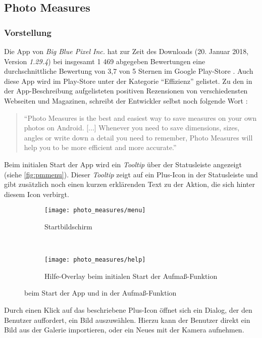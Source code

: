\subsection{Photo Measures}

\subsubsection{Vorstellung}
Die App \pm{} von \emph{Big Blue Pixel Inc.} hat zur Zeit des Downloads (20. Januar 2018, Version \emph{1.29.4}) bei insgesamt 1 469 abgegeben Bewertungen eine durchschnittliche Bewertung von 3,7 von 5 Sternen im Google Play-Store \citep{PixelPM}.
Auch diese App wird im Play-Store unter der Kategorie ``Effizienz'' gelistet.
Zu den in der App-Beschreibung aufgelisteten positiven Rezensionen von verschiedensten Webseiten und Magazinen, schreibt der Entwickler selbst noch folgende Wort \citep{PixelPM}:

\begin{quote}
  ``Photo Measures is the best and easiest way to save measures on your own photos on Android.
  [...] Whenever you need to save dimensions, sizes, angles or write down a detail you need to remember, Photo Measures will help you to be more efficient and more accurate.''
\end{quote}

\noindent
Beim initialen Start der App wird ein \emph{Tooltip} über der Statusleiste angezeigt (siehe \autoref{fig:pmmenu}).
Dieser \emph{Tooltip} zeigt auf ein Plus-Icon in der Statusleiste und gibt zusätzlich noch einen kurzen erklärenden Text zu der Aktion, die sich hinter diesem Icon verbirgt.

\begin{figure}[h]
  \begin{subfigure}[t]{0.4\textwidth}
    \centering
    \texttt{[image: photo\_measures/menu]}
    \caption{Startbildschirm}
    \label{fig:pmmenu}	
  \end{subfigure}
  ~
  \begin{subfigure}[t]{0.4\textwidth}
    \centering
    \texttt{[image: photo\_measures/help]}
    \caption{Hilfe-Overlay beim initialen Start der Aufmaß-Funktion} 
    \label{fig:pmhelp}	
  \end{subfigure}
  \centering
  \caption{\pm{} beim Start der App und in der Aufmaß-Funktion}
\end{figure}

\noindent
Durch einen Klick auf das beschriebene Plus-Icon öffnet sich ein Dialog, der den Benutzer auffordert, ein Bild auszuwählen.
Hierzu kann der Benutzer direkt ein Bild aus der Galerie importieren, oder ein Neues mit der Kamera aufnehmen. \\

